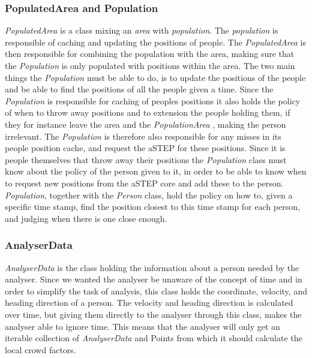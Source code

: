 \subsubsection{PopulatedArea and Population}
\emph{PopulatedArea} is a class mixing an \emph{area} with \emph{population}. The \emph{population} is responsible of caching and updating the positions of people. The \emph{PopulatedArea} is then responsible for combining the population with the area, making sure that the \emph{Population} is only populated with positions within the area. The two main things the \emph{Population} must be able to do, is to update the positions of the people and be able to find the positions of all the people given a time. Since the \emph{Population} is responsible for caching of peoples positions it also holds the policy of when to throw away positions and to extension the people holding them, if they for instance leave the area and the \emph{PopulationArea} , making the person irrelevant. The \emph{Population} is therefore also responsible for any misses in its people position cache, and request the aSTEP for these positions. Since it is people themselves that throw away their positions the \emph{Population} class must know about the policy of the person given to it, in order to be able to know when to request new positions from the aSTEP core and add these to the person. \emph{Population}, together with the \emph{Person} class, hold the policy on how to, given a specific time stamp, find the position closest to this time stamp for each person, and judging when there is one close enough.

\subsubsection{AnalyserData}
\emph{AnalyserData} is the class holding the information about a person needed by the analyser. Since we wanted the analyser be unaware of the concept of time and in order to simplify the task of analysis, this class holds the coordinate, velocity, and heading direction of a person. The velocity and heading direction is calculated over time, but giving them directly to the analyser through this class, makes the analyser able to ignore time. This means that the analyser will only get an iterable collection of \emph{AnalyserData} and Points from which it should calculate the local crowd factors. 

